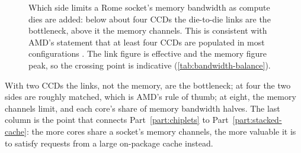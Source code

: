 \begin{figure}[htbp]
\centering
{}
\caption[Which side limits a Rome socket's memory bandwidth as compute dies are added]{Which side limits a Rome socket's memory bandwidth as compute dies are added: below about four CCDs the die-to-die links are the bottleneck, above it the memory channels. This is consistent with AMD's statement that at least four CCDs are populated in most configurations \cite{naffziger2020chiplet}. The link figure is effective and the memory figure peak, so the crossing point is indicative (\cref{tab:bandwidth-balance}).}
\label{fig:bandwidth-balance}
\end{figure}


With two CCDs the links, not the memory, are the bottleneck; at four the two sides are roughly matched, which is AMD's rule of thumb; at eight, the memory channels limit, and each core's share of memory bandwidth halves. The last column is the point that connects Part~\ref{part:chiplets} to Part~\ref{part:stacked-cache}: the more cores share a socket's memory channels, the more valuable it is to satisfy requests from a large on-package cache instead.

